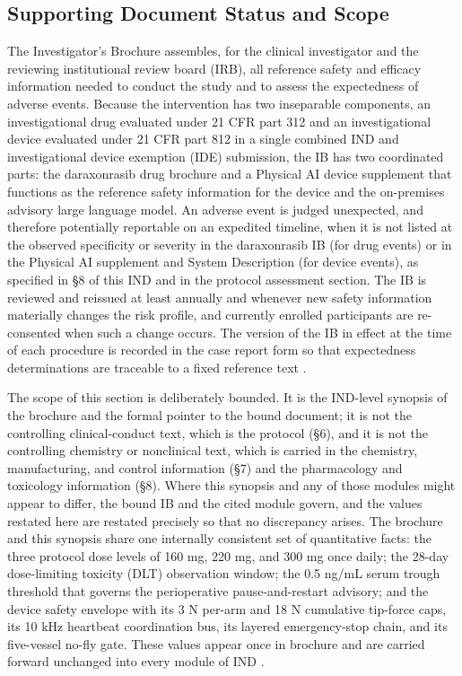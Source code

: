\subsection*{Supporting Document Status and Scope}

The Investigator's Brochure assembles, for the clinical investigator and the
reviewing institutional review board (IRB), all reference safety and efficacy
information needed to conduct the study and to assess the expectedness of adverse
events. Because the intervention has two inseparable components, an investigational
drug evaluated under 21 CFR part 312 and an investigational device evaluated under
21 CFR part 812 in a single combined IND and investigational device exemption (IDE)
submission, the IB has two coordinated parts: the daraxonrasib drug brochure and a
Physical AI device supplement that functions as the reference safety information for
the device and the on-premises advisory large language model. An adverse event is
judged unexpected, and therefore potentially reportable on an expedited timeline,
when it is not listed at the observed specificity or severity in the daraxonrasib
IB (for drug events) or in the Physical AI supplement and System Description (for
device events), as specified in \S 8 of this IND and in the protocol assessment
section. The IB is reviewed and reissued at least annually and whenever new safety
information materially changes the risk profile, and currently enrolled
participants are re-consented when such a change occurs. The version of the IB in
effect at the time of each procedure is recorded in the case report form so that
expectedness determinations are traceable to a fixed reference text
\cite{daraxwhipple,cfr312paiuni}.

The scope of this section is deliberately bounded. It is the IND-level synopsis
of the brochure and the formal pointer to the bound document; it is not the
controlling clinical-conduct text, which is the protocol (\S 6), and it is not the
controlling chemistry or nonclinical text, which is carried in the chemistry,
manufacturing, and control information (\S 7) and the pharmacology and toxicology
information (\S 8). Where this synopsis and any of those modules might appear to
differ, the bound IB and the cited module govern, and the values restated here are
restated precisely so that no discrepancy arises. The brochure and this synopsis
share one internally consistent set of quantitative facts: the three protocol dose
levels of 160 mg, 220 mg, and 300 mg once daily; the 28-day dose-limiting toxicity
(DLT) observation window; the 0.5 ng/mL serum trough threshold that governs the
perioperative pause-and-restart advisory; and the device safety envelope with its
3 N per-arm and 18 N cumulative tip-force caps, its 10 kHz heartbeat coordination
bus, its layered emergency-stop chain, and its five-vessel no-fly gate. These
values appear once in brochure and are carried forward unchanged into every
module of IND \cite{daraxwhipple,onpremwhippl}.

